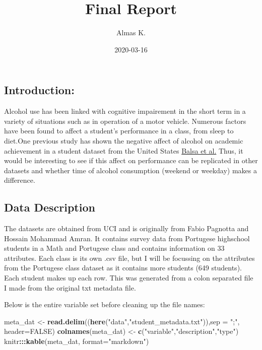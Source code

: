 \documentclass[]{article}
\title{Final Report}
\author{Almas K.}
\date{2020-03-16}
\newenvironment{Shaded}{\begin{snugshade}}{\end{snugshade}}
\newcommand{\DataTypeTok}[1]{\textcolor[rgb]{0.13,0.29,0.53}{#1}}
\newcommand{\KeywordTok}[1]{\textcolor[rgb]{0.13,0.29,0.53}{\textbf{#1}}}
\newcommand{\NormalTok}[1]{#1}
\newcommand{\OperatorTok}[1]{\textcolor[rgb]{0.81,0.36,0.00}{\textbf{#1}}}
\newcommand{\OtherTok}[1]{\textcolor[rgb]{0.56,0.35,0.01}{#1}}
\newcommand{\StringTok}[1]{\textcolor[rgb]{0.31,0.60,0.02}{#1}}
\begin{document}
\maketitle

\hypertarget{introduction}{%
\subsection{Introduction:}\label{introduction}}

Alcohol use has been linked with cognitive impairement in the short term
in a variety of situations such as in operation of a motor vehicle.
Numerous factors have been found to affect a student's performance in a
class, from sleep to diet.One previous study has shown the negative
affect of alcohol on academic achievement in a student dataset from the
United States
\href{https://www.ncbi.nlm.nih.gov/pmc/articles/PMC3026599/}{Balsa et
al.} Thus, it would be interesting to see if this affect on performance
can be replicated in other datasets and whether time of alcohol
consumption (weekend or weekday) makes a difference.

\hypertarget{data-description}{%
\subsection{Data Description}\label{data-description}}

The datasets are obtained from UCI and is originally from Fabio Pagnotta
and Hossain Mohammad Amran. It contains survey data from Portugese
highschool students in a Math and Portugese class and contains
information on 33 attributes. Each class is its own .csv file, but I
will be focussing on the attributes from the Portugese class dataset as
it contains more students (649 students). Each student makes up each
row. This was generated from a colon separated file I made from the
original txt metadata file.

Below is the entire variable set before cleaning up the file names:

\begin{Shaded}
\begin{Highlighting}[]
\NormalTok{meta_dat <-}\StringTok{ }\KeywordTok{read.delim}\NormalTok{((}\KeywordTok{here}\NormalTok{(}\StringTok{"data"}\NormalTok{,}\StringTok{"student_metadata.txt"}\NormalTok{)),}\DataTypeTok{sep =} \StringTok{";"}\NormalTok{, }\DataTypeTok{header=}\OtherTok{FALSE}\NormalTok{)}
\KeywordTok{colnames}\NormalTok{(meta_dat) <-}\StringTok{ }\KeywordTok{c}\NormalTok{(}\StringTok{"variable"}\NormalTok{,}\StringTok{"description"}\NormalTok{,}\StringTok{"type"}\NormalTok{)}
\NormalTok{knitr}\OperatorTok{:::}\KeywordTok{kable}\NormalTok{(meta_dat, }\DataTypeTok{format=}\StringTok{"markdown"}\NormalTok{)}
\end{Highlighting}
\end{Shaded}
\end{document}
